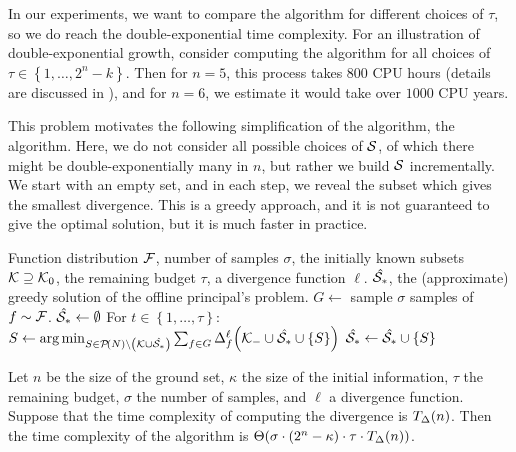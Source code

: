 In our experiments, we want to compare the \algFO{} algorithm for different choices of $ \tau $, so we do reach the double-exponential time complexity.
For an illustration of double-exponential growth, consider computing the \algFO{} algorithm for all choices of $ \tau \in \left\{ 1, \ldots, 2^n-k \right\} $.
Then for $ n=5 $, this process takes $ 800 $ CPU hours (details are discussed in ), and for $ n=6 $, we estimate it would take over $ 1000 $ CPU years.

This problem motivates the following simplification of the \algFO{} algorithm, the \algFG{} algorithm.
Here, we do not consider all possible choices of $ \mathcal{S} $, of which there might be double-exponentially many in $ n $, but rather we build $ \mathcal{S} $ incrementally.
We start with an empty set, and in each step, we reveal the subset which gives the smallest divergence.
This is a greedy approach, and it is not guaranteed to give the optimal solution, but it is much faster in practice.

\begin{algor}{\label{alg:fg}\algFG{}}{Function distribution $ \mathcal{F} $, number of samples $ \sigma $, the initially known subsets $ \mathcal{K} \supseteq \mathcal{K}_0 $, the remaining budget $ \tau $, a divergence function $ \ell $.}
  {$ \hat{\mathcal{S}_*} $, the (approximate) greedy solution of the offline principal's problem.}
  \State $ G \gets $ sample $ \sigma $ samples of $ f \sim \mathcal{F} $.
  \State $ \hat{\mathcal{S}_*} \gets \emptyset $
  \Indent For $ t \in \left\{ 1, \dots, \tau \right\} $:
  \State $ S \gets \operatorname*{arg\,min}_{S \in \mathcal{P}\!\left(N\right) \setminus \left( \mathcal{K} \cup \hat{\mathcal{S}_*} \right)} \sum_{f \in G} \Delta_{f}^{\ell}\!\left(\mathcal{K}_- \cup \hat{\mathcal{S}_*} \cup \left\{ S \right\}\right) $
  \State $ \hat{\mathcal{S}_*} \gets \hat{\mathcal{S}_*} \cup \left\{ S \right\} $
  \EndIndent
  
\end{algor}

\begin{prop}
  Let $ n $ be the size of the ground set, $ \kappa $ the size of the initial information, $ \tau $ the remaining budget, $ \sigma $ the number of samples, and $ \ell $ a divergence function.
  Suppose that the time complexity of computing the divergence is $ T_\Delta\!\left(n\right) $.
  Then the time complexity of the \algFG{} algorithm is $ \Theta\!\left(\sigma \cdot \left( 2^n-\kappa \right)\cdot\tau \cdot T_\Delta\!\left(n\right)\right) $.
\end{prop}

